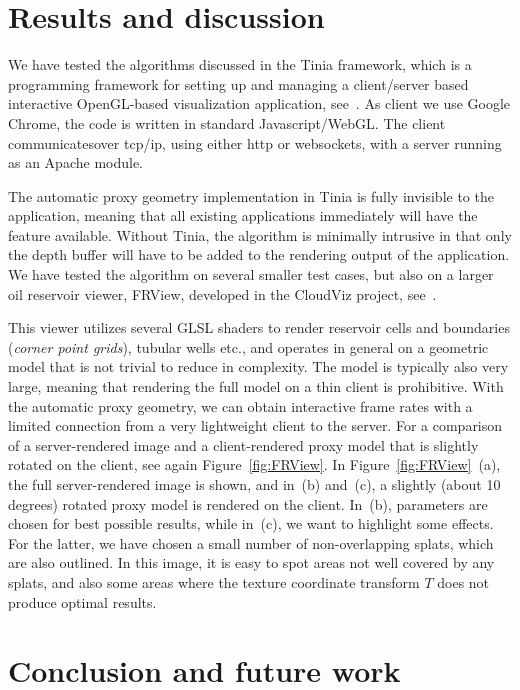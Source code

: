 \section{Results and discussion}

We have tested the algorithms discussed in the Tinia framework, which is a
programming framework for setting up and managing a client/server based
interactive OpenGL-based visualization application, see~\cite{tinia}. As client
we use Google Chrome, the code is written in standard Javascript/WebGL.
The client communicatesover tcp/ip, using either http or
websockets, with a server running as an Apache module.

The automatic proxy geometry implementation in Tinia is fully invisible to the
application, meaning that all existing applications immediately will have the
feature available. Without Tinia, the algorithm is minimally intrusive in that
only the depth buffer will have to be added to the rendering output of the
application. We have tested the algorithm on several smaller test cases, but
also on a larger oil reservoir viewer, FRView, developed in the CloudViz
project, see~\cite{cloudviz}.

This viewer utilizes several GLSL shaders to render reservoir cells and
boundaries ({\em corner point grids}), tubular wells etc., and operates in
general on a geometric model that is not trivial to reduce in complexity. The
model is typically also very large, meaning that rendering the full model on a
thin client is prohibitive. With the automatic proxy geometry, we can obtain
interactive frame rates with a limited connection from a very lightweight client
to the server. For a comparison of a server-rendered image and a client-rendered
proxy model that is slightly rotated on the client, see again
Figure~\ref{fig:FRView}. {\color{red}In Figure~\ref{fig:FRView}~(a), the full
server-rendered image is shown, and in~(b) and~(c), a slightly (about 10
degrees) rotated proxy model is rendered on the client. In~(b), parameters are
chosen for best possible results, while in~(c), we want to highlight some
effects. For the latter, we have chosen a small number of non-overlapping
splats, which are also outlined. In this image, it is easy to spot areas not
well covered by any splats, and also some areas where the texture coordinate
transform $T$ does not produce optimal results.}


\section{Conclusion and future work}

